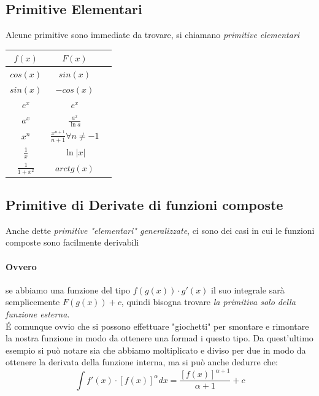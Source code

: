 \documentclass[12pt, a4paper, openany]{book}
\begin{document}
\subsection{Primitive Elementari}
Alcune primitive sono immediate da trovare, si chiamano \emph{primitive elementari}\\
\begin{tabular}{ |c|c|c| }
	\hline
	$f(x)$            & $F(x)$                                  \\
	\hline
	$cos(x)$          & $sin(x)$                                \\
	\hline
	$sin(x)$          & $-cos(x)$                               \\
	\hline
	$e^x$             & $e^x$                                   \\
	\hline
	$a^x$             & $\frac{a^x}{\ln a} $                    \\
	\hline
	$x^n$             & $\frac{x^{n+1}}{n+1} \forall n\neq -1 $ \\
	\hline
	$\frac{1}{x}$     & $\ln |x| $                              \\
	\hline
	$\frac{1}{1+x^2}$ & $arctg(x) $                             \\
	\hline
\end{tabular}
\subsection{Primitive di Derivate di funzioni composte}
Anche dette \emph{primitive "elementari" generalizzate}, ci sono dei casi in cui le funzioni composte sono facilmente derivabili
\paragraph*{Ovvero} se abbiamo una funzione del tipo $f(g(x)) \cdot g'(x)$ il suo integrale sarà semplicemente $F(g(x)) + c$, quindi bisogna trovare \emph{la primitiva solo della funzione esterna}.
\\\'E comunque ovvio che si possono effettuare "giochetti" per smontare e rimontare la nostra funzione in modo da ottenere una formad i questo tipo.
Da quest'ultimo esempio si può notare sia che abbiamo moltiplicato e diviso per due in modo da ottenere la derivata della funzione interna,
ma si può anche dedurre che:
$$
\int f'(x) \cdot [ f(x)]^\alpha dx = \frac{[f(x)]^{\alpha+1}}{\alpha + 1} + c
$$
\end{document}
